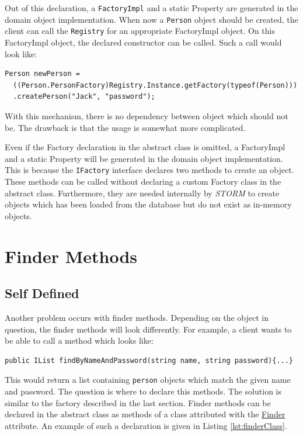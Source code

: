 		Out of this declaration, a \verb~FactoryImpl~ and a static Property are generated 
		in the domain object implementation. When now a \verb~Person~ object should be created, the client can
		call the \verb~Registry~ for an appropriate FactoryImpl object. On this FactoryImpl object,
		the declared constructor can be called. Such a call would look like:
		\begin{Verbatim}
Person newPerson =
  ((Person.PersonFactory)Registry.Instance.getFactory(typeof(Person)))
  .createPerson("Jack", "password");
		\end{Verbatim}
		
		With this mechanism, there is no dependency between object which should not be. The drawback
		is that the usage is somewhat more complicated.
		
		Even if the Factory declaration in the abstract class is omitted, a FactoryImpl and a
		static Property will be generated in the domain object implementation.
		This is because the \verb~IFactory~ interface declares two methods to create an object. These
		methods can be called without declaring a custom Factory class in the abstract class. Furthermore,
		they are needed internally by \textit{STORM} to create objects which has been loaded from
		the database but do not exist as in-memory objects.
		
	\section{Finder Methods}
		\subsection{Self Defined}
			Another problem occurs with finder methods. Depending on the object in question, the
			finder methods will look differently. For example, a client wants to be able to call
			a method which looks like: 
			\begin{Verbatim}
public IList findByNameAndPassword(string name, string password){...}
			\end{Verbatim}
			This would return a list containing \verb~person~ objects which match the given name and password.
			The question is where to declare this methods.
			The solution is similar to the factory described in the last section. Finder methods
			can be declared in the abstract class as methods of a class attributed with the 
			\hyperlink{FinderAttribute}{Finder} attribute.
			An	example of such a declaration is given in Listing \ref{lst:finderClass}.
				
